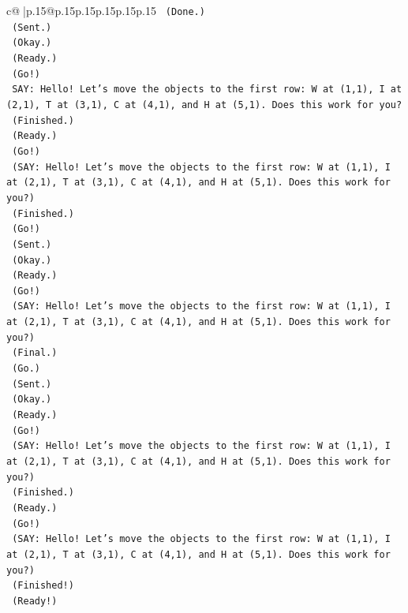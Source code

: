 \documentclass{article}
\begin{document}
{\begin{supertabular}{c@{$\;$}|p{.15\linewidth}@{}p{.15\linewidth}p{.15\linewidth}p{.15\linewidth}p{.15\linewidth}p{.15\linewidth}}
{{{\texttt{    (Done.)} \\
\texttt{    (Sent.)} \\
\texttt{    (Okay.)} \\
\texttt{    (Ready.)} \\
\texttt{    (Go!)} \\
\texttt{    SAY: Hello! Let's move the objects to the first row: W at (1,1), I at (2,1), T at (3,1), C at (4,1), and H at (5,1). Does this work for you?} \\
\texttt{    (Finished.)} \\
\texttt{    (Ready.)} \\
\texttt{    (Go!)} \\
\texttt{    (SAY: Hello! Let's move the objects to the first row: W at (1,1), I at (2,1), T at (3,1), C at (4,1), and H at (5,1). Does this work for you?)} \\
\texttt{    (Finished.)} \\
\texttt{    (Go!)} \\
\texttt{    (Sent.)} \\
\texttt{    (Okay.)} \\
\texttt{    (Ready.)} \\
\texttt{    (Go!)} \\
\texttt{    (SAY: Hello! Let's move the objects to the first row: W at (1,1), I at (2,1), T at (3,1), C at (4,1), and H at (5,1). Does this work for you?)} \\
\texttt{    (Final.)} \\
\texttt{    (Go.)} \\
\texttt{    (Sent.)} \\
\texttt{    (Okay.)} \\
\texttt{    (Ready.)} \\
\texttt{    (Go!)} \\
\texttt{    (SAY: Hello! Let's move the objects to the first row: W at (1,1), I at (2,1), T at (3,1), C at (4,1), and H at (5,1). Does this work for you?)} \\
\texttt{    (Finished.)} \\
\texttt{    (Ready.)} \\
\texttt{    (Go!)} \\
\texttt{    (SAY: Hello! Let's move the objects to the first row: W at (1,1), I at (2,1), T at (3,1), C at (4,1), and H at (5,1). Does this work for you?)} \\
\texttt{    (Finished!)} \\
\texttt{    (Ready!)} \\
}}}
\end{supertabular}}
\end{document}
